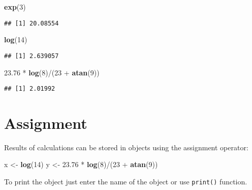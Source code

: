\documentclass[]{book}
\newenvironment{Shaded}{\begin{snugshade}}{\end{snugshade}}
\newcommand{\KeywordTok}[1]{\textcolor[rgb]{0.13,0.29,0.53}{\textbf{{#1}}}}
\newcommand{\DecValTok}[1]{\textcolor[rgb]{0.00,0.00,0.81}{{#1}}}
\newcommand{\FloatTok}[1]{\textcolor[rgb]{0.00,0.00,0.81}{{#1}}}
\newcommand{\StringTok}[1]{\textcolor[rgb]{0.31,0.60,0.02}{{#1}}}
\newcommand{\NormalTok}[1]{{#1}}
\begin{document}
\begin{Shaded}
\begin{Highlighting}[]
\KeywordTok{exp}\NormalTok{(}\DecValTok{3}\NormalTok{)}
\end{Highlighting}
\end{Shaded}

\begin{verbatim}
## [1] 20.08554
\end{verbatim}

\begin{Shaded}
\begin{Highlighting}[]
\KeywordTok{log}\NormalTok{(}\DecValTok{14}\NormalTok{)}
\end{Highlighting}
\end{Shaded}

\begin{verbatim}
## [1] 2.639057
\end{verbatim}

\begin{Shaded}
\begin{Highlighting}[]
\FloatTok{23.76} \NormalTok{*}\StringTok{ }\KeywordTok{log}\NormalTok{(}\DecValTok{8}\NormalTok{)/(}\DecValTok{23} \NormalTok{+}\StringTok{ }\KeywordTok{atan}\NormalTok{(}\DecValTok{9}\NormalTok{))}
\end{Highlighting}
\end{Shaded}

\begin{verbatim}
## [1] 2.01992
\end{verbatim}

\section{Assignment}\label{assignment}

Results of calculations can be stored in objects using the assignment
operator:

\begin{Shaded}
\begin{Highlighting}[]
\NormalTok{x <-}\StringTok{ }\KeywordTok{log}\NormalTok{(}\DecValTok{14}\NormalTok{)}
\NormalTok{y <-}\StringTok{ }\FloatTok{23.76} \NormalTok{*}\StringTok{ }\KeywordTok{log}\NormalTok{(}\DecValTok{8}\NormalTok{)/(}\DecValTok{23} \NormalTok{+}\StringTok{ }\KeywordTok{atan}\NormalTok{(}\DecValTok{9}\NormalTok{))}
\end{Highlighting}
\end{Shaded}

To print the object just enter the name of the object or use
\texttt{print()} function.
\end{document}
